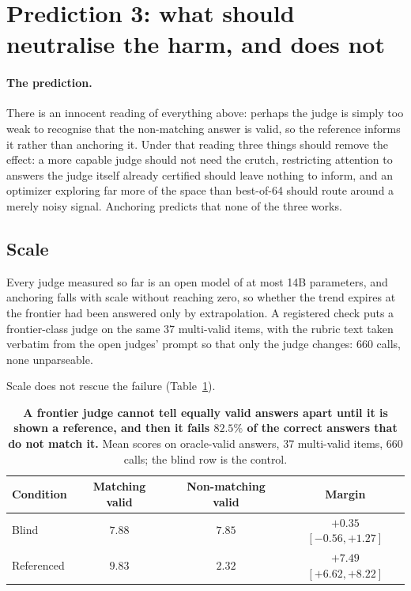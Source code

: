 \documentclass[11pt]{article}
\begin{document}
\section{Prediction 3: what should neutralise the harm, and does not}
\label{sec:p3}

\paragraph{The prediction.}
There is an innocent reading of everything above: perhaps the judge is simply too weak to recognise that the non-matching answer is valid, so the reference informs it rather than anchoring it.
Under that reading three things should remove the effect: a more capable judge should not need the crutch, restricting attention to answers the judge itself already certified should leave nothing to inform, and an optimizer exploring far more of the space than best-of-64 should route around a merely noisy signal.
Anchoring predicts that none of the three works.

\subsection{Scale}
\label{sec:frontier}

Every judge measured so far is an open model of at most 14B parameters, and anchoring falls with scale without reaching zero, so whether the trend expires at the frontier had been answered only by extrapolation.
A registered check puts a frontier-class judge on the same 37 multi-valid items, with the rubric text taken verbatim from the open judges' prompt so that only the judge changes: 660 calls, none unparseable.

Scale does not rescue the failure (Table~\ref{tab:frontier2}).

\begin{table}[tbp]
\centering
\small
\setlength{\tabcolsep}{7pt}
\begin{tabular}{lccc}
\toprule
Condition & Matching valid & Non-matching valid & Margin \\
\midrule
Blind & $7.88$ & $7.85$ & $+0.35$ {\scriptsize$[-0.56, +1.27]$} \\
Referenced & $9.83$ & $\mathbf{2.32}$ & $\mathbf{+7.49}$ {\scriptsize$[+6.62, +8.22]$} \\
\bottomrule
\end{tabular}
\caption{\textbf{A frontier judge cannot tell equally valid answers apart until it is shown a reference, and then it fails $82.5\%$ of the correct answers that do not match it.} Mean scores on oracle-valid answers, 37 multi-valid items, 660 calls; the blind row is the control.}
\label{tab:frontier2}
\end{table}
\end{document}
